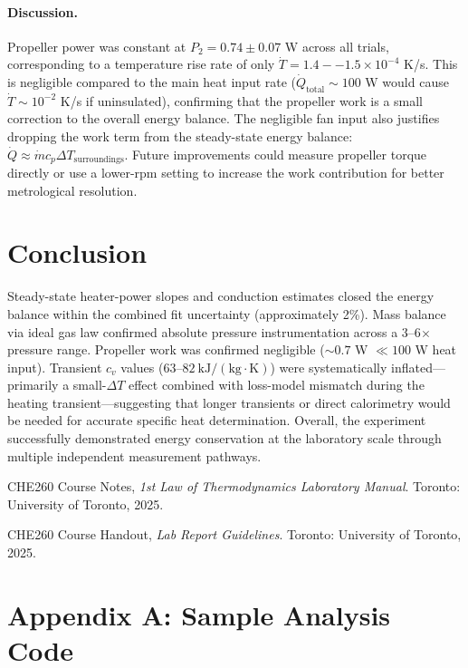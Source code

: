 \documentclass[12pt]{article}
\begin{document}
\paragraph{Discussion.} Propeller power was constant at $P_2 = 0.74 \pm 0.07$ W across all trials, corresponding to a temperature rise rate of only $\dot{T} = 1.4--1.5 \times 10^{-4}$ K/s. This is negligible compared to the main heat input rate ($\dot{Q}_{\text{total}} \sim 100$ W would cause $\dot{T} \sim 10^{-2}$ K/s if uninsulated), confirming that the propeller work is a small correction to the overall energy balance. The negligible fan input also justifies dropping the work term from the steady-state energy balance: $\dot{Q} \approx \dot{m} c_p \Delta T_{\text{surroundings}}$. Future improvements could measure propeller torque directly or use a lower-rpm setting to increase the work contribution for better metrological resolution.

\section*{Conclusion}
Steady-state heater-power slopes and conduction estimates closed the energy balance within the combined fit uncertainty (approximately 2\%). Mass balance via ideal gas law confirmed absolute pressure instrumentation across a 3--6$\times$ pressure range. Propeller work was confirmed negligible ($\sim 0.7$ W $\ll 100$ W heat input). Transient $c_v$ values ($63$--$82~\mathrm{kJ/(kg \cdot K)}$) were systematically inflated—primarily a small-$\Delta T$ effect combined with loss-model mismatch during the heating transient—suggesting that longer transients or direct calorimetry would be needed for accurate specific heat determination. Overall, the experiment successfully demonstrated energy conservation at the laboratory scale through multiple independent measurement pathways.

\begin{thebibliography}{9}
CHE260 Course Notes, \textit{1st Law of Thermodynamics Laboratory Manual}. Toronto: University of Toronto, 2025.

CHE260 Course Handout, \textit{Lab Report Guidelines}. Toronto: University of Toronto, 2025.
\end{thebibliography}

\newpage

\appendix

\section*{Appendix A: Sample Analysis Code}
\end{document}
